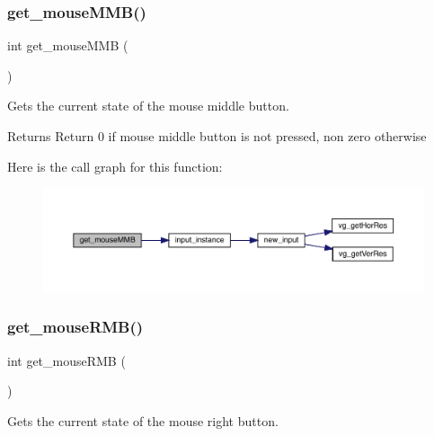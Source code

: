\subsubsection{\texorpdfstring{get\+\_\+mouse\+M\+M\+B()}{get\_mouseMMB()}}
{\footnotesize\ttfamily int get\+\_\+mouse\+M\+MB (\begin{DoxyParamCaption}{ }\end{DoxyParamCaption})}



Gets the current state of the mouse middle button. 

\begin{DoxyReturn}{Returns}
Return 0 if mouse middle button is not pressed, non zero otherwise 
\end{DoxyReturn}
Here is the call graph for this function\+:\nopagebreak
\begin{figure}[H]
\begin{center}
\leavevmode
\includegraphics[width=350pt]{group___input_ga38c8f84d3704d46011eee4fd423abaa2_cgraph}
\end{center}
\end{figure}
\hypertarget{group___input_ga5d6fc0beedad492333795ddff18c20b9}{}\label{group___input_ga5d6fc0beedad492333795ddff18c20b9} 
\subsubsection{\texorpdfstring{get\+\_\+mouse\+R\+M\+B()}{get\_mouseRMB()}}
{\footnotesize\ttfamily int get\+\_\+mouse\+R\+MB (\begin{DoxyParamCaption}{ }\end{DoxyParamCaption})}



Gets the current state of the mouse right button. 


